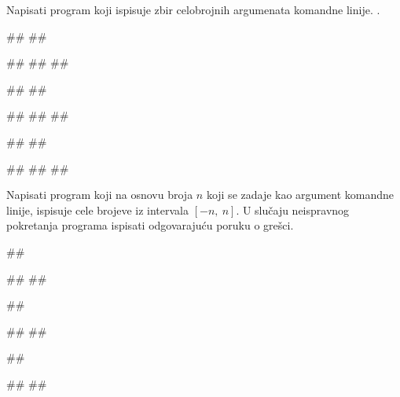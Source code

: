 \begin{Exercise}[label=p2.6_01] 
Napisati program koji ispisuje zbir celobrojnih argumenata komandne linije. 
.

\begin{minitest}
\begin{upotreba}{1}
#\naslovPokretanje#
##

#\naslovIzlaz#
##
##
\end{upotreba}
\end{minitest}
\begin{minitest}
\begin{upotreba}{2}
#\naslovPokretanje#
##

#\naslovIzlaz#
##
##
\end{upotreba}
\end{minitest}
\begin{minitest}
\begin{upotreba}{3}
#\naslovPokretanje#
##

#\naslovIzlaz#
##
##
\end{upotreba}
\end{minitest}
\end{Exercise}
\ifresenja
\begin{Answer}[ref=p2.6_01]
\end{Answer}
 \fi

 
\begin{Exercise}[label=p2.6_04] 
 Napisati program koji na osnovu broja $n$ koji se zadaje kao argument komandne 
 linije, ispisuje cele brojeve iz intervala $[-n,\ n]$.
 U slučaju neispravnog pokretanja programa ispisati odgovarajuću poruku o grešci.
 
\begin{minitest}
\begin{upotreba}{1}
##

#\naslovIzlaz#
##
\end{upotreba}
\end{minitest}
\begin{minitest}
\begin{upotreba}{2}
##

#\naslovIzlaz#
##
\end{upotreba}
\end{minitest}
\begin{minitest}
\begin{upotreba}{3}
##

#\naslovIzlaz#
##
\end{upotreba}
\end{minitest}

\end{Exercise}
\ifresenja
\begin{Answer}[ref=p2.6_04]
\end{Answer}
 \fi 
 


